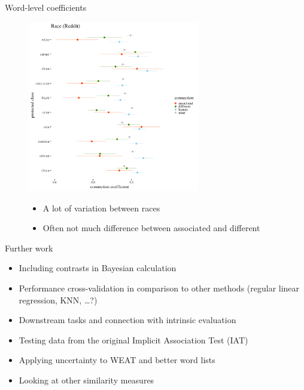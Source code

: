 \documentclass[10pt,ignorenonframetext,x11names, dvipsnames, bibspacing,natbib]{beamer}
\providecommand{\tightlist}{%
  \setlength{\itemsep}{0pt}\setlength{\parskip}{0pt}}
\begin{document}
\begin{frame}{Word-level coefficients}

\begin{figure}[!htb]\centering
  \begin{minipage}{0.55\textwidth}
\includegraphics[width=7.5cm]{../images/visRaceReddit.png}
\end{minipage}
\begin{minipage}{0.4\textwidth}\footnotesize

\vspace{-4cm}

   \begin{itemize}
   \item A lot of variation between races
   
   \item Often not much difference between associated and different
   \end{itemize}
   \end{minipage}
\end{figure}

\end{frame}

\begin{frame}{Further work}

\begin{itemize}
\tightlist
\item
  Including contrasts in Bayesian calculation
\item
  Performance cross-validation in comparison to other methods (regular
  linear regression, KNN, \dots?)
\item
  Downstream tasks and connection with intrinsic evaluation
\item
  Testing data from the original Implicit Association Test (IAT)
\item
  Applying uncertainty to WEAT and better word lists
\item
  Looking at other similarity measures
\end{itemize}

\end{frame}
\end{document}
